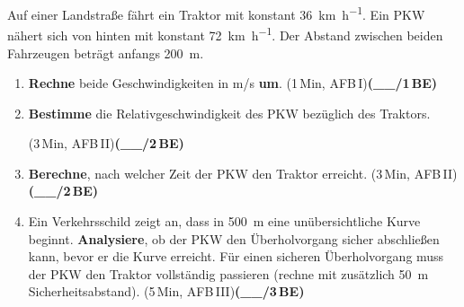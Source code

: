 \documentclass[11pt,a4paper]{article}
\newcommand{\BEZEIT}[3]{%
\hfill{\small\color{zeitgray}(#1\,Min, AFB\,#2)}\quad\textbf{(\_\_/#3\,BE)}%
}
\begin{document}
\newpage


\noindent{}

\vspace{0.4cm}

Auf einer Landstraße fährt ein Traktor mit konstant \SI{36}{\kilo\metre\per\hour}. Ein PKW nähert sich von hinten mit konstant \SI{72}{\kilo\metre\per\hour}. Der Abstand zwischen beiden Fahrzeugen beträgt anfangs \SI{200}{\metre}.

\vspace{0.3cm}

\begin{enumerate}
\item[a)] \textbf{Rechne} beide Geschwindigkeiten in m/s \textbf{um}. \BEZEIT{1}{I}{1}

\vspace{2.5cm}

\item[b)] \textbf{Bestimme} die Relativgeschwindigkeit des PKW bezüglich des Traktors.

\hfill{\small\color{zeitgray}(3\,Min, AFB\,II)}\quad\textbf{(\_\_/2\,BE)}

\vspace{3.2cm}

\item[c)] \textbf{Berechne}, nach welcher Zeit der PKW den Traktor erreicht. \BEZEIT{3}{II}{2}

\vspace{3.5cm}

\item[d)] Ein Verkehrsschild zeigt an, dass in \SI{500}{\metre} eine unübersichtliche Kurve beginnt. \textbf{Analysiere}, ob der PKW den Überholvorgang sicher abschließen kann, bevor er die Kurve erreicht. Für einen sicheren Überholvorgang muss der PKW den Traktor vollständig passieren (rechne mit zusätzlich \SI{50}{\metre} Sicherheitsabstand). \BEZEIT{5}{III}{3}

\vspace{5cm}

\end{enumerate}

\newpage
\end{document}
